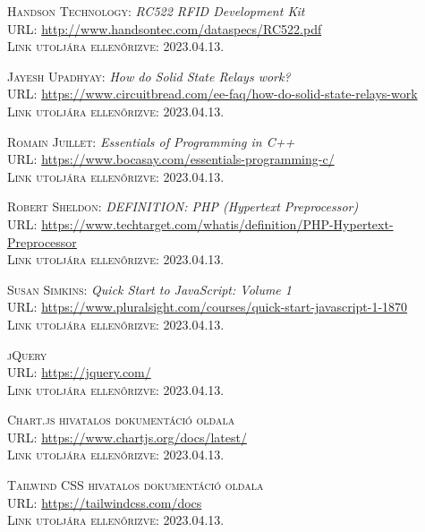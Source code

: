 \documentclass[
]{thesis-ekf}
\theoremstyle{definition}
\theoremstyle{remark}
\begin{document}
\begin{thebibliography}{46}
		\textsc{Handson Technology:} \emph{RC522 RFID Development Kit}\\
		\textsc{URL:} \url{http://www.handsontec.com/dataspecs/RC522.pdf}\\
		\textsc{Link utoljára ellenőrizve:} 2023.04.13.
		
		\textsc{Jayesh Upadhyay:} \emph{How do Solid State Relays work?}\\
		\textsc{URL:} \url{https://www.circuitbread.com/ee-faq/how-do-solid-state-relays-work}\\
		\textsc{Link utoljára ellenőrizve:} 2023.04.13.
		
		\textsc{Romain Juillet:} \emph{Essentials of Programming in C++}\\
		\textsc{URL:} \url{https://www.bocasay.com/essentials-programming-c/}\\
		\textsc{Link utoljára ellenőrizve:} 2023.04.13.
		
		\textsc{Robert Sheldon:} \emph{DEFINITION: PHP (Hypertext Preprocessor)}\\
		\textsc{URL:} \url{https://www.techtarget.com/whatis/definition/PHP-Hypertext-Preprocessor}\\
		\textsc{Link utoljára ellenőrizve:} 2023.04.13.
		
		\textsc{Susan Simkins:} \emph{Quick Start to JavaScript: Volume 1}\\
		\textsc{URL:} \url{https://www.pluralsight.com/courses/quick-start-javascript-1-1870}\\
		\textsc{Link utoljára ellenőrizve:} 2023.04.13.
		
		\textsc{jQuery}\\
		\textsc{URL:} \url{https://jquery.com/}\\
		\textsc{Link utoljára ellenőrizve:} 2023.04.13.
		
		\textsc{Chart.js hivatalos dokumentáció oldala}\\
		\textsc{URL:} \url{https://www.chartjs.org/docs/latest/}\\
		\textsc{Link utoljára ellenőrizve:} 2023.04.13.
		
		\textsc{Tailwind CSS hivatalos dokumentáció oldala}\\
		\textsc{URL:} \url{https://tailwindcss.com/docs}\\
		\textsc{Link utoljára ellenőrizve:} 2023.04.13.
		

\end{thebibliography}
\end{document}
